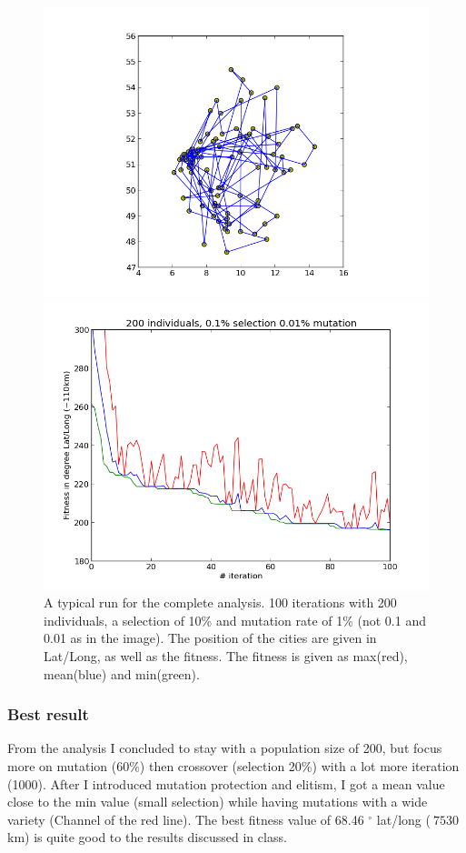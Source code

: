 \documentclass{scrartcl}
\begin{document}
\begin{figure}[H]
\centering
\begin{minipage}{.5\textwidth}
  \centering
  \includegraphics[width=.8\linewidth]{img/ex3/196,29-30-100-200-0,1-0,01.png}
\end{minipage}%
\begin{minipage}{.5\textwidth}
  \centering
  \includegraphics[width=.8\linewidth]{img/ex3/196,29-30-100-200-0,1-0,01-fitness.png}
\end{minipage}
\caption{A typical run for the complete analysis. 100 iterations with 200 individuals, a selection of 10\% and mutation rate of 1\% (not 0.1 and 0.01 as in the image). The position of the cities are given in Lat/Long, as well as the fitness. The fitness is given as max(red), mean(blue) and min(green).}
\label{fig:typicalfit}
\end{figure}

\subsubsection{Best result}
From the analysis I concluded to stay with a population size of 200, but focus more on mutation (60\%) then crossover (selection 20\%) with a lot more iteration (1000). After I introduced mutation protection and elitism, I got a mean value close to the min value (small selection) while having mutations with a wide variety (Channel of the red line). The best fitness value of 68.46 $^\circ$ lat/long ($~7530$ km) is quite good to the results discussed in class.
\end{document}
